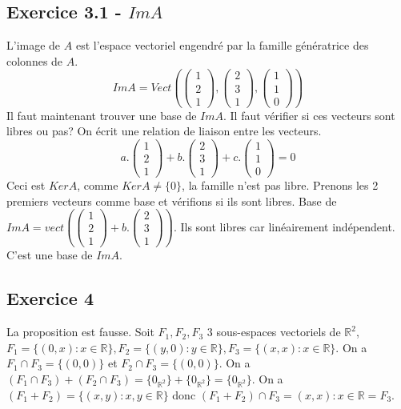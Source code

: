 \documentclass[]{book}
\theoremstyle{definition}
\newcommand{\bb}[1]{\mathbb{#1}}
\newcommand{\R}{\bb{R}}
\begin{document}
\subsection*{Exercice 3.1 - $Im A$}
L'image de $A$ est l'espace vectoriel engendr\'e par la famille g\'en\'eratrice des colonnes de $A$.
$$Im A =  Vect(\begin{pmatrix} 1 \\ 2 \\ 1 \end{pmatrix},\begin{pmatrix} 2 \\ 3 \\ 1 \end{pmatrix},\begin{pmatrix} 1 \\ 1 \\ 0 \end{pmatrix})$$
Il faut maintenant trouver une base de $Im A$.
Il faut v\'erifier si ces vecteurs sont libres ou pas? On \'ecrit une relation de liaison entre les vecteurs.
$$a.\begin{pmatrix}1\\2\\1\end{pmatrix} + b.\begin{pmatrix}2\\3\\1\end{pmatrix} + c.\begin{pmatrix}1\\1\\0\end{pmatrix} = 0$$
Ceci est $Ker A$, comme $Ker A \neq \{0\}$, la famille n'est pas libre. Prenons les 2 premiers vecteurs comme base et v\'erifions si ils sont libres.
Base de $Im A = vect(\begin{pmatrix}1\\2\\1\end{pmatrix} + b.\begin{pmatrix}2\\3\\1\end{pmatrix})$. Ils sont libres car lin\'eairement ind\'ependent. C'est une base de $Im A$.



\subsection*{Exercice 4}
La proposition est fausse. Soit $F_1,F_2,F_3$ 3 sous-espaces vectoriels de $\R^2$, $F_1=\{(0,x): x \in \R\}, F_2=\{(y,0): y \in \R\}, F_3=\{(x,x): x \in \R\}$. On a $F_1 \cap F_3 = \{(0,0)\}$ et $F_2 \cap F_3 = \{(0,0)\}$. On a $(F_1 \cap F_3) + (F_2 \cap F_3) = \{0_{\R^2}\} + \{0_{\R^2}\} = \{0_{\R^2}\}$. On a $(F_1 + F_2) = \{(x,y):x,y \in \R\}$ donc $(F_1 + F_2) \cap F_3 = {(x,x):x \in \R} = F_3$.
\end{document}
